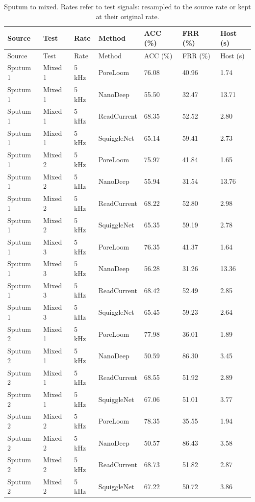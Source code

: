 \begin{longtable}{lllllll}
\caption{Sputum to mixed. Rates refer to test signals: resampled to the source rate or kept at their original rate.}\label{tab:s_forward}\\
\toprule
Source & Test & Rate & Method & ACC (\%) & FRR (\%) & Host (s)\\\midrule\endfirsthead
\toprule
Source & Test & Rate & Method & ACC (\%) & FRR (\%) & Host (s)\\\midrule\endhead
\bottomrule\endfoot
Sputum 1 & Mixed 1 & 5 kHz & PoreLoom & 76.08 & 40.96 & 1.74\\
Sputum 1 & Mixed 1 & 5 kHz & NanoDeep & 55.50 & 32.47 & 13.71\\
Sputum 1 & Mixed 1 & 5 kHz & ReadCurrent & 68.35 & 52.52 & 2.80\\
Sputum 1 & Mixed 1 & 5 kHz & SquiggleNet & 65.14 & 59.41 & 2.73\\
Sputum 1 & Mixed 2 & 5 kHz & PoreLoom & 75.97 & 41.84 & 1.65\\
Sputum 1 & Mixed 2 & 5 kHz & NanoDeep & 55.94 & 31.54 & 13.76\\
Sputum 1 & Mixed 2 & 5 kHz & ReadCurrent & 68.22 & 52.80 & 2.98\\
Sputum 1 & Mixed 2 & 5 kHz & SquiggleNet & 65.35 & 59.19 & 2.78\\
Sputum 1 & Mixed 3 & 5 kHz & PoreLoom & 76.35 & 41.37 & 1.64\\
Sputum 1 & Mixed 3 & 5 kHz & NanoDeep & 56.28 & 31.26 & 13.36\\
Sputum 1 & Mixed 3 & 5 kHz & ReadCurrent & 68.42 & 52.49 & 2.85\\
Sputum 1 & Mixed 3 & 5 kHz & SquiggleNet & 65.45 & 59.23 & 2.64\\
Sputum 2 & Mixed 1 & 5 kHz & PoreLoom & 77.98 & 36.01 & 1.89\\
Sputum 2 & Mixed 1 & 5 kHz & NanoDeep & 50.59 & 86.30 & 3.45\\
Sputum 2 & Mixed 1 & 5 kHz & ReadCurrent & 68.55 & 51.92 & 2.89\\
Sputum 2 & Mixed 1 & 5 kHz & SquiggleNet & 67.06 & 51.01 & 3.77\\
Sputum 2 & Mixed 2 & 5 kHz & PoreLoom & 78.35 & 35.55 & 1.94\\
Sputum 2 & Mixed 2 & 5 kHz & NanoDeep & 50.57 & 86.43 & 3.58\\
Sputum 2 & Mixed 2 & 5 kHz & ReadCurrent & 68.73 & 51.82 & 2.87\\
Sputum 2 & Mixed 2 & 5 kHz & SquiggleNet & 67.22 & 50.72 & 3.86\\

\end{longtable}
